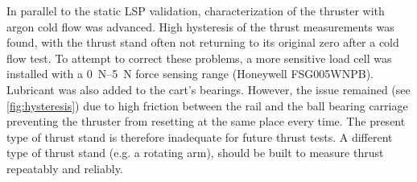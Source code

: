 In parallel to the static LSP validation, characterization of the thruster with argon cold flow was advanced. High hysteresis of the thrust measurements was found, with the thrust stand often not returning to its original zero after a cold flow test. To attempt to correct these problems, a more sensitive load cell was installed with a \qtyrange{0}{5}{N} force sensing range (Honeywell FSG005WNPB). Lubricant was also added to the cart's bearings. However, the issue remained (see \autoref{fig:hysteresis}) due to high friction between the rail and the ball bearing carriage preventing the thruster from resetting at the same place every time. The present type of thrust stand is therefore inadequate for future thrust tests. A different type of thrust stand (e.g. a rotating arm), should be built to measure thrust repeatably and reliably.

